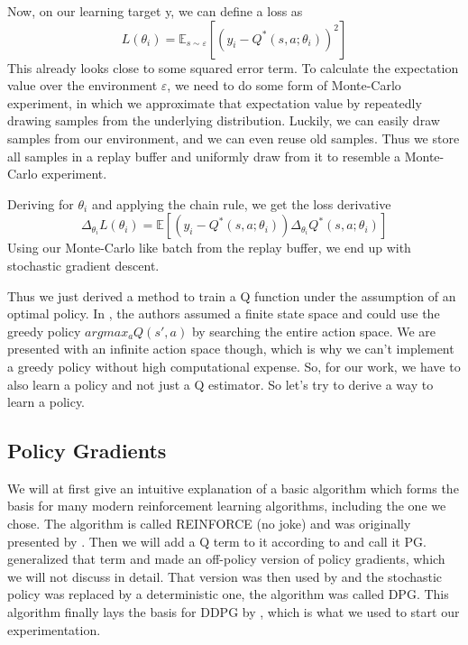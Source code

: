 \documentclass[hyperref,beleg]{cgvpub}
\begin{document}
Now, on our learning target y, we can define a loss as
\begin{equation}
L(\theta_i) = \mathbb{E}_{s \sim \varepsilon}[(y_i - Q^*(s, a;\theta_i))^2]
\end{equation}
This already looks close to some squared error term. To calculate the expectation value over the environment $\varepsilon$, we need to do some form of Monte-Carlo experiment, in which we approximate that expectation value by repeatedly drawing samples from the underlying distribution. Luckily, we can easily draw samples from our environment, and we can even reuse old samples. Thus we store all samples in a replay buffer and uniformly draw from it to resemble a Monte-Carlo experiment. 

Deriving for $\theta_i$ and applying the chain rule, we get the loss derivative
\begin{equation}
\Delta_{\theta_i} L(\theta_i) = \mathbb{E}[(y_i - Q^*(s, a;\theta_i))\Delta_{\theta_i}Q^*(s, a;\theta_i)]
\end{equation}
Using our Monte-Carlo like batch from the replay buffer, we end up with stochastic gradient descent.

Thus we just derived a method to train a Q function under the assumption of an optimal policy. In \cite{mnihPlayingAtariDeep2013}, the authors assumed a finite state space and could use the greedy policy $argmax_a Q(s', a)$ by searching the entire action space. We are presented with an infinite action space though, which is why we can't implement a greedy policy without high computational expense. So, for our work, we have to also learn a policy and not just a Q estimator. So let's try to derive a way to learn a policy.


\subsection{Policy Gradients}

We will at first give an intuitive explanation of a basic algorithm which forms the basis for many modern reinforcement learning algorithms, including the one we chose. The algorithm is called \ac{REINFORCE} (no joke) and was originally presented by \cite{williamsSimpleStatisticalGradientfollowing}. Then we will add a Q term to it according to \cite{suttonPolicyGradientMethods} and call it \ac{PG}. \cite{degrisOffPolicyActorCritic2013} generalized that term and made an off-policy version of policy gradients, which we will not discuss in detail. That version was then used by \cite{silverDeterministicPolicyGradient2013} and the stochastic policy was replaced by a deterministic one, the algorithm was called \ac{DPG}. This algorithm finally lays the basis for \ac{DDPG} by \cite{lillicrapCONTINUOUSCONTROLDEEP2015}, which is what we used to start our experimentation.
\end{document}
